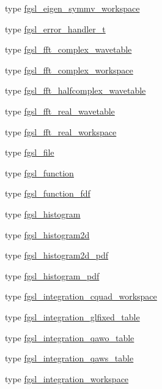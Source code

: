 \begin{DoxyCompactItemize}
type \hyperlink{structfgsl_1_1fgsl__eigen__symmv__workspace}{fgsl\-\_\-eigen\-\_\-symmv\-\_\-workspace}
\item 
type \hyperlink{structfgsl_1_1fgsl__error__handler__t}{fgsl\-\_\-error\-\_\-handler\-\_\-t}
\item 
type \hyperlink{structfgsl_1_1fgsl__fft__complex__wavetable}{fgsl\-\_\-fft\-\_\-complex\-\_\-wavetable}
\item 
type \hyperlink{structfgsl_1_1fgsl__fft__complex__workspace}{fgsl\-\_\-fft\-\_\-complex\-\_\-workspace}
\item 
type \hyperlink{structfgsl_1_1fgsl__fft__halfcomplex__wavetable}{fgsl\-\_\-fft\-\_\-halfcomplex\-\_\-wavetable}
\item 
type \hyperlink{structfgsl_1_1fgsl__fft__real__wavetable}{fgsl\-\_\-fft\-\_\-real\-\_\-wavetable}
\item 
type \hyperlink{structfgsl_1_1fgsl__fft__real__workspace}{fgsl\-\_\-fft\-\_\-real\-\_\-workspace}
\item 
type \hyperlink{structfgsl_1_1fgsl__file}{fgsl\-\_\-file}
\item 
type \hyperlink{structfgsl_1_1fgsl__function}{fgsl\-\_\-function}
\item 
type \hyperlink{structfgsl_1_1fgsl__function__fdf}{fgsl\-\_\-function\-\_\-fdf}
\item 
type \hyperlink{structfgsl_1_1fgsl__histogram}{fgsl\-\_\-histogram}
\item 
type \hyperlink{structfgsl_1_1fgsl__histogram2d}{fgsl\-\_\-histogram2d}
\item 
type \hyperlink{structfgsl_1_1fgsl__histogram2d__pdf}{fgsl\-\_\-histogram2d\-\_\-pdf}
\item 
type \hyperlink{structfgsl_1_1fgsl__histogram__pdf}{fgsl\-\_\-histogram\-\_\-pdf}
\item 
type \hyperlink{structfgsl_1_1fgsl__integration__cquad__workspace}{fgsl\-\_\-integration\-\_\-cquad\-\_\-workspace}
\item 
type \hyperlink{structfgsl_1_1fgsl__integration__glfixed__table}{fgsl\-\_\-integration\-\_\-glfixed\-\_\-table}
\item 
type \hyperlink{structfgsl_1_1fgsl__integration__qawo__table}{fgsl\-\_\-integration\-\_\-qawo\-\_\-table}
\item 
type \hyperlink{structfgsl_1_1fgsl__integration__qaws__table}{fgsl\-\_\-integration\-\_\-qaws\-\_\-table}
\item 
type \hyperlink{structfgsl_1_1fgsl__integration__workspace}{fgsl\-\_\-integration\-\_\-workspace}

\end{DoxyCompactItemize}
